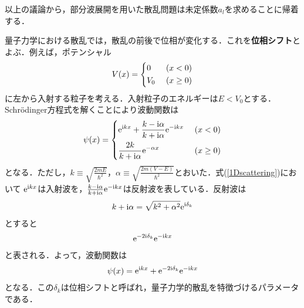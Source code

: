 \documentclass{report}
\begin{document}
  以上の議論から，部分波展開を用いた散乱問題は未定係数$a_l$を求めることに帰着する．

  量子力学における散乱では，散乱の前後で位相が変化する．これを\textbf{位相シフト}とよぶ．例えば，ポテンシャル
  \begin{align}
    V(x) = 
    \begin{dcases}
      0\ &(x < 0)\\
      V_0\ &(x \geq 0)
    \end{dcases}
  \end{align}
  に左から入射する粒子を考える．入射粒子のエネルギーは$E<V_0$とする．Schrödinger方程式を解くことにより波動関数は
  \begin{align}
    \psi(x) = 
    \begin{dcases}
      \label{1Dscattering}
      \mathrm{e}^{\mathrm{i} kx} + \frac{k -\mathrm{i}\alpha}{k + \mathrm{i}\alpha} \mathrm{e}^{-\mathrm{i} kx}\ &(x < 0)\\
      \frac{2k}{k + \mathrm{i}\alpha}\mathrm{e}^{-\alpha x}\ &(x \geq 0)
    \end{dcases}
  \end{align}
  となる．ただし，$k \equiv \sqrt{\frac{2mE}{\hbar^2}}，\alpha \equiv \sqrt{\frac{2m(V-E)}{\hbar^2}}$とおいた．式(\ref{1Dscattering})において
  $\mathrm{e}^{\mathrm{i} kx}$は入射波を，$\frac{k -\mathrm{i}\alpha}{k + \mathrm{i}\alpha} \mathrm{e}^{-\mathrm{i} kx}$は反射波を表している．反射波は
  \begin{align}
    k + \mathrm{i}\alpha = \sqrt{k^2 + \alpha^2} \mathrm{e}^{\mathrm{i}\delta_k}
  \end{align}
  とすると
  \begin{align}
    \mathrm{e}^{-2 \mathrm{i} \delta_k}\mathrm{e}^{-\mathrm{i} kx}
  \end{align}
  と表される．よって，波動関数は
  \begin{align}
    \psi(x) = \mathrm{e}^{\mathrm{i} kx} + \mathrm{e}^{-2 \mathrm{i} \delta_k}\mathrm{e}^{-\mathrm{i} kx}
  \end{align}
  となる．この$\delta_k$は位相シフトと呼ばれ，量子力学的散乱を特徴づけるパラメータである．
\end{document}
